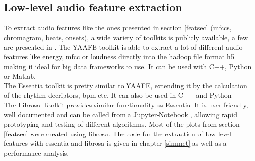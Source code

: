 \subsection{Low-level audio feature extraction}
To extract audio features like the ones presented in section \ref{featsec} (mfccs, chromagram, beats, onsets), a wide variety of toolkits is publicly available, a few are presented in \cite{audiofeattoolb}.
The YAAFE toolkit \cite{yaafe1} is able to extract a lot of different audio features like energy, mfcc or loudness directly into the hadoop file format h5 making it ideal for big data frameworks to use. It can be used with C++, Python or Matlab.\\
The Essentia toolkit \cite{essentia1} is pretty similar to YAAFE, extending it by the calculation of the rhythm decriptors, bpm etc. It can also be used in C++ and Python\\
The Librosa Toolkit provides similar functionality \cite{labrosa1} as Essentia. It is user-friendly, well documented and can be called from a Jupyter-Notebook \cite{jupyter}, allowing rapid prototyping and testing of different algorithms. Most of the plots from section \ref{featsec} were created using librosa. The code for the extraction of low level features with essentia and librosa is given in chapter \ref{simmet} as well as a performance analysis.\\

